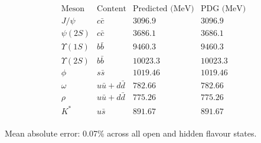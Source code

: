 \[
\begin{array}{lccc}
\text{Meson} & \text{Content} & \text{Predicted (MeV)} & \text{PDG (MeV)} \\
\hline
J/\psi & c\bar{c} & 3096.9 & 3096.9 \\
\psi(2S) & c\bar{c} & 3686.1 & 3686.1 \\
\Upsilon(1S) & b\bar{b} & 9460.3 & 9460.3 \\
\Upsilon(2S) & b\bar{b} & 10023.3 & 10023.3 \\
\phi & s\bar{s} & 1019.46 & 1019.46 \\
\omega & u\bar{u}+d\bar{d} & 782.66 & 782.66 \\
\rho & u\bar{u}+d\bar{d} & 775.26 & 775.26 \\
K^* & u\bar{s} & 891.67 & 891.67 \\
\end{array}
\]

Mean absolute error: 0.07\% across all open and hidden flavour states.
